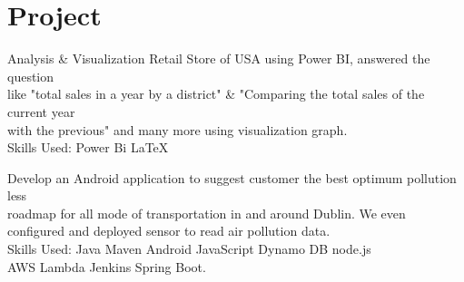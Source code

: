 \documentclass[]{aj-resume-openfont}
\begin{document}
\begin{minipage}[t]{0.66\textwidth}




\section{Project}

Analysis \& Visualization Retail Store of USA using Power BI, answered the question\\
like "total sales in a year by a district" \& "Comparing the total sales of the current year\\
with the previous" and many more using visualization graph.\\
Skills Used: \textbullet{} Power Bi \textbullet{} \LaTeX\
\sectionsep

Develop an Android application to suggest customer the best optimum pollution less\\
roadmap for all mode of transportation in and around Dublin. We even configured and deployed sensor to read air pollution data.\\
Skills Used: \textbullet{} Java \textbullet{} Maven \textbullet{} Android \textbullet{} JavaScript \textbullet{} Dynamo DB
\textbullet{} node.js\\ \textbullet{} AWS Lambda \textbullet{} Jenkins \textbullet{} Spring Boot.
\sectionsep


\end{minipage}
\end{document}
